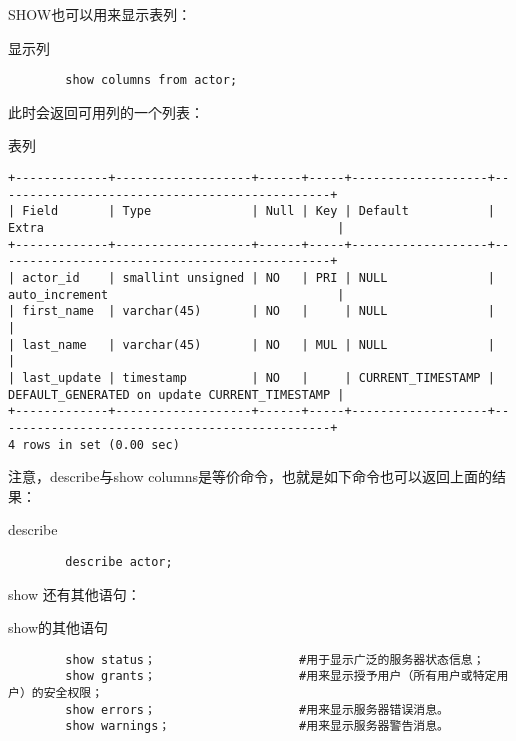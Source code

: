\documentclass[UTF8]{article}
\begin{document}
SHOW也可以用来显示表列：

\begin{listing}[H]
	\caption{显示列}
	\label{code:showcolumn}
	\begin{verbatim}
        show columns from actor;
\end{verbatim}
\end{listing}

此时会返回可用列的一个列表：

\begin{listing}[H]
	\caption{表列}
	\label{code:columnlist}
	\begin{verbatim}
+-------------+-------------------+------+-----+-------------------+-----------------------------------------------+
| Field       | Type              | Null | Key | Default           | Extra                                         |
+-------------+-------------------+------+-----+-------------------+-----------------------------------------------+
| actor_id    | smallint unsigned | NO   | PRI | NULL              | auto_increment                                |
| first_name  | varchar(45)       | NO   |     | NULL              |                                               |
| last_name   | varchar(45)       | NO   | MUL | NULL              |                                               |
| last_update | timestamp         | NO   |     | CURRENT_TIMESTAMP | DEFAULT_GENERATED on update CURRENT_TIMESTAMP |
+-------------+-------------------+------+-----+-------------------+-----------------------------------------------+
4 rows in set (0.00 sec)
\end{verbatim}
\end{listing}
注意，describe与show columns是等价命令，也就是如下命令也可以返回上面的结果：
\begin{listing}[H]
	\caption{describe}
	\label{code:describe等价命令}
	\begin{verbatim}
        describe actor;
\end{verbatim}
\end{listing}

show 还有其他语句：
\begin{listing}[H]
	\caption{show的其他语句}
	\label{code:show的其他语句}
	\begin{verbatim}
        show status；                    #用于显示广泛的服务器状态信息；
        show grants；                    #用来显示授予用户（所有用户或特定用户）的安全权限；
        show errors；                    #用来显示服务器错误消息。
        show warnings；                  #用来显示服务器警告消息。
\end{verbatim}
\end{listing}
\end{document}
